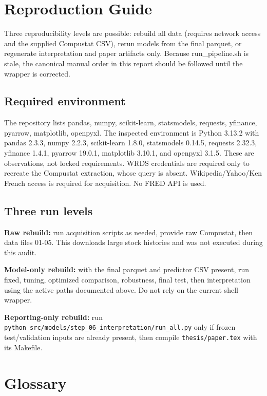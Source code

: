 \documentclass[
  11pt,
  a4paper]{article}
\begin{document}
\section{Reproduction Guide}\label{sec-22}

Three reproducibility levels are possible: rebuild all data (requires
network access and the supplied Compustat CSV), rerun models from the
final parquet, or regenerate interpretation and paper artifacts only.
Because run\_\allowbreak{}pipeline.sh is stale, the canonical manual order in this
report should be followed until the wrapper is corrected.

\subsection{Required environment}\label{sec-environment}

The repository lists pandas, numpy, scikit-learn, statsmodels, requests,
yfinance, pyarrow, matplotlib, openpyxl. The inspected environment is
Python 3.13.2 with pandas 2.3.3, numpy 2.2.3, scikit-learn 1.8.0,
statsmodels 0.14.5, requests 2.32.3, yfinance 1.4.1, pyarrow 19.0.1,
matplotlib 3.10.1, and openpyxl 3.1.5. These are observations, not
locked requirements. WRDS credentials are required only to recreate the
Compustat extraction, whose query is absent. Wikipedia/Yahoo/Ken French
access is required for acquisition. No FRED API is used.

\subsection{Three run levels}\label{sec-run-levels}

\textbf{Raw rebuild:} run acquisition scripts as needed, provide raw
Compustat, then data files 01-05. This downloads large stock histories
and was not executed during this audit.

\textbf{Model-only rebuild:} with the final parquet and predictor CSV
present, run fixed, tuning, optimized comparison, robustness, final
test, then interpretation using the active paths documented above. Do
not rely on the current shell wrapper.

\textbf{Reporting-only rebuild:} run
\texttt{python\ src/models/step\_\allowbreak{}06\_\allowbreak{}interpretation/run\_\allowbreak{}all.py} only if
frozen test/validation inputs are already present, then compile
\texttt{thesis/paper.tex} with its Makefile.

\section{Glossary}\label{sec-23}
\end{document}
